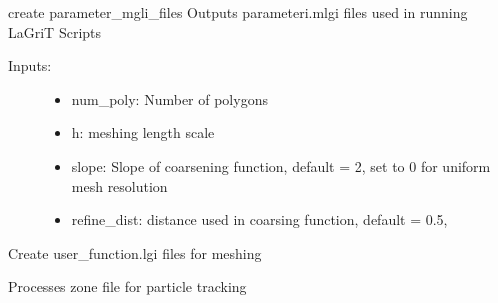 \documentclass[letterpaper,10pt,english]{sphinxmanual}
\begin{document}
\begin{fulllineitems}
\label{\detokenize{pydfnworks:pydfnworks.lagrit_scripts.create_parameter_mlgi_file}}
create parameter\_mgli\_files
Outputs parameteri.mlgi files used in running LaGriT Scripts
\begin{description}
\item[{Inputs:}] \leavevmode\begin{itemize}
\item {} 
num\_poly: Number of polygons

\item {} 
h: meshing length scale

\item {} 
slope: Slope of coarsening function, default = 2, 
set to 0 for uniform mesh resolution

\item {} 
refine\_dist: distance used in coarsing function, default = 0.5,

\end{itemize}

\end{description}

\end{fulllineitems}


\begin{fulllineitems}
\label{\detokenize{pydfnworks:pydfnworks.lagrit_scripts.create_user_functions}}
Create user\_function.lgi files for meshing

\end{fulllineitems}


\begin{fulllineitems}
\label{\detokenize{pydfnworks:pydfnworks.lagrit_scripts.define_zones}}
Processes zone file for particle tracking

\end{fulllineitems}
\end{document}

